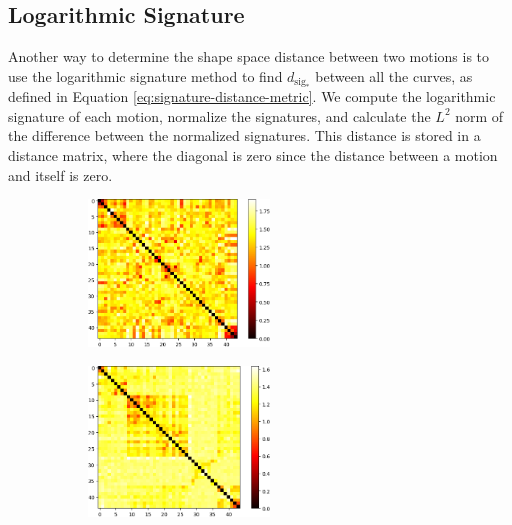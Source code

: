 \subsection{Logarithmic Signature}
\label{subsec:motion-capture-log-signature}

Another way to determine the shape space distance between two motions is to use the logarithmic signature method to find \(d_{\text{sig}_*}\) between all the curves, as defined in Equation \eqref{eq:signature-distance-metric}. We compute the logarithmic signature of each motion, normalize the signatures, and calculate the \(L^2\) norm of the difference between the normalized signatures. This distance is stored in a distance matrix, where the diagonal is zero since the distance between a motion and itself is zero.

\begin{figure}
    \centering
    \begin{subfigure}{\textwidth}
        \centering
        \includegraphics[width=0.53\textwidth]{figures/motion-capture-data/heatmaps/logsig_1.png}
        \caption{}
        \label{fig:heatmaps-logsig-1}
    \end{subfigure}
    \begin{subfigure}{\textwidth}
        \centering
        \includegraphics[width=0.53\textwidth]{figures/motion-capture-data/heatmaps/logsig_2.png}
        \caption{}
        \label{fig:heatmaps-logsig-2}

\end{subfigure}
\end{figure}
